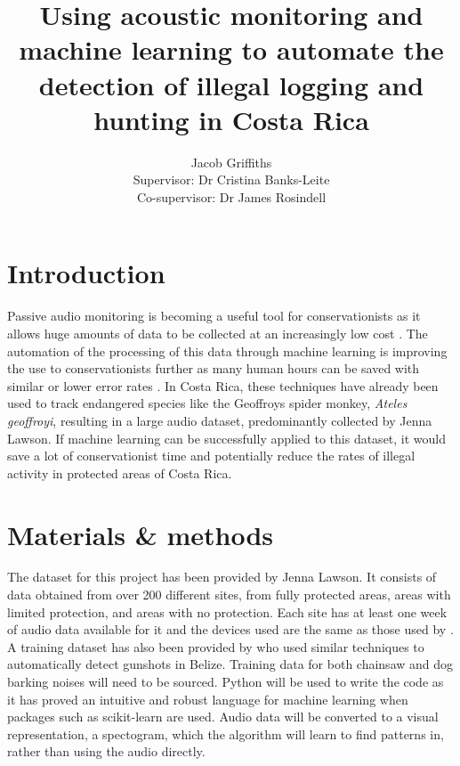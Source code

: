 \documentclass[11pt, titlepage]{article}
\title{Using acoustic monitoring and machine learning to 
automate the detection of illegal logging and hunting in 
Costa Rica}
\author{Jacob Griffiths\\
[1cm]{\small Supervisor: Dr Cristina Banks-Leite}\\
{\small Co-supervisor: Dr James Rosindell}}
\date{}
\begin{document}
  \maketitle


  \section*{Introduction}
    Passive audio monitoring is becoming a useful tool for 
    conservationists as it allows huge amounts of data 
    to be collected at an increasingly low cost \citep{Hill2018}. 
    The automation of the processing of this data through machine
    learning is improving the use to conservationists further
    as many human hours can be saved with similar or lower error 
    rates \citep{Kalan2015}.
    In Costa Rica, these techniques have already been used to 
    track endangered species like the Geoffroys spider monkey,
    \textit{Ateles geoffroyi}, resulting
    in a large audio dataset, predominantly collected by Jenna
    Lawson. If machine learning can be successfully applied to 
    this dataset, it would save a lot of conservationist time and
    potentially reduce the rates of illegal activity in protected
    areas of Costa Rica.



  \section*{Materials \& methods}
    The dataset for this project has been provided by Jenna
    Lawson. It consists of data obtained from over 200 different sites, 
    from fully protected areas, areas with limited protection, and 
    areas with no protection. Each site has at least one week 
    of audio data available for it and the devices used are the same 
    as those used by \cite{Hill2018}.
    A training dataset has also been provided by \cite{Hill2018}
    who used similar techniques to automatically detect gunshots
    in Belize. Training data for both chainsaw and dog barking
    noises will need to be sourced. 
    Python will be used to write the code as it has proved an intuitive
    and robust language for machine learning when packages such as 
    scikit-learn are used. Audio data will be converted to a 
    visual representation, a spectogram, which the algorithm
    will learn to find patterns in, rather than using the audio
    directly.
\end{document}
